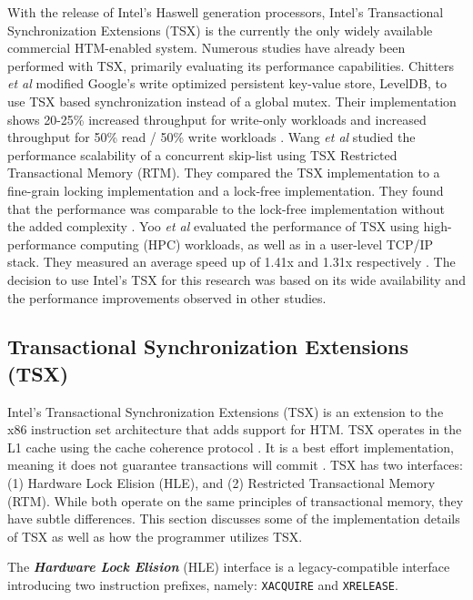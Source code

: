\documentclass{sig-alternate}
\begin{document}
With the release of Intel's Haswell generation processors, Intel's Transactional
Synchronization Extensions (TSX) is the currently the only widely available commercial
HTM-enabled system.  Numerous studies have already been performed with TSX, primarily
evaluating its performance capabilities.  Chitters \emph{et al} modified Google's write
optimized persistent key-value store, LevelDB, to use TSX based synchronization instead of
a global mutex.  Their implementation shows 20-25\% increased throughput for write-only
workloads and increased throughput for 50\% read / 50\% write workloads
\cite{chitters_tsx}.  Wang \emph{et al} studied the performance scalability of a
concurrent skip-list using TSX Restricted Transactional Memory (RTM).  They compared the
TSX implementation to a fine-grain locking implementation and a lock-free implementation.
They found that the performance was comparable to the lock-free implementation without the
added complexity \cite{wang_tsx}.  Yoo \emph{et al} evaluated the performance of TSX using
high-performance computing (HPC) workloads, as well as in a user-level TCP/IP stack.  They
measured an average speed up of 1.41x and 1.31x respectively \cite{yoo_tsx}.  The decision
to use Intel's TSX for this research was based on its wide availability and the
performance improvements observed in other studies.

\subsection{Transactional Synchronization Extensions (TSX)}

Intel's Transactional Synchronization Extensions (TSX) is an extension to the x86
instruction set architecture that adds support for HTM.  TSX operates in the L1 cache
using the cache coherence protocol \cite{intel_opt_man}.  It is a best effort
implementation, meaning it does not guarantee transactions will commit
\cite{intel_prog_ref}.  TSX has two interfaces: (1) Hardware Lock Elision (HLE), and (2)
Restricted Transactional Memory (RTM).  While both operate on the same principles of
transactional memory, they have subtle differences.  This section discusses some of the
implementation details of TSX as well as how the programmer utilizes TSX.

The \emph{\textbf{Hardware Lock Elision}} (HLE) interface is a legacy-compatible interface
introducing two instruction prefixes, namely: \texttt{XACQUIRE} and \texttt{XRELEASE}.
\end{document}
